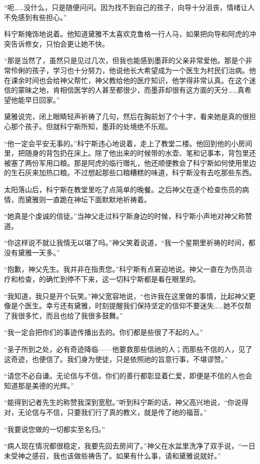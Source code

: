 “呃……没什么，只是随便问问。因为找不到自己的孩子，向导十分沮丧，情绪让人不免感到有些担心。”

科宁斯掩饰地说着。他知道黛雅不太喜欢克鲁格一行人马，如果把向导和阿虎的冲突告诉修女，只怕会更让她不快。

“那是当然了，虽然只是见过几次，但我也能感到墨菲的父亲非常爱他。那是个非常伶俐的孩子，学习也十分努力，他说他长大希望成为一个医生为村民们治病。他在课余时间也会给神父帮忙，神父教给他的医疗知识，他学得非常认真。在这个迷信的蒙昧之地，肯相信医学的人甚至都很少，而墨菲却很有这方面的天分……真希望他能早日回家。”

黛雅说完，闭上眼睛轻声祈祷了几句，然后在胸前划了个十字，看来她是真的很担心那个孩子。但就科宁斯所知，墨菲的处境绝不乐观。

“他一定会平安无事的。”科宁斯违心地说着，走上了教堂二楼。他回到他的小房间里，把随身的背包扔在床上。除了他出来的时候带的水壶、笔和记事本，背包里还被塞了两份军用口粮。那是阿虎的临行赠礼，他还顺便教会了科宁斯如何使用里边的生石灰来加热口粮。不过想起那些口粮糟糕的味道，科宁斯没有去吃那些东西。

太阳落山后，科宁斯在教堂里吃了点简单的晚餐。之后神父在逐个检查伤员的病情，而黛雅则一直跪在神坛下面默默地祈祷着。

“她真是个虔诚的信徒。”当神父走过科宁斯身边的时候，科宁斯小声地对神父称赞道。

“你这样说不就让我情无以堪了吗。”神父笑着说道，“我一个星期里祈祷的时间，都没有黛雅一天多。”

“抱歉，神父先生。我并非在指责您。”科宁斯有点窘迫地说。神父一直在为伤员治疗和检查，的确忙到停不下来，这一切科宁斯都是看在眼里的。

“我知道，我只是开个玩笑。”神父宽容地说，“也许我在这里做的事情，比起神父更像是个医生。幸亏还有黛雅，时刻提醒我们保持坚定的信仰不要迷失……她不仅帮了我很多忙，而且也给了我很多鼓舞。”

“我一定会把你们的事迹传播出去的。你们都是些很了不起的人。”

“圣子所到之处，必有奇迹降临——他要救那些信祂的人；而那些不信的人，见了这奇迹，也便信了。我们身为使徒，只是依照祂的旨意行事，不堪谬赞。”

“请您不必自谦。无论信与不信，你们的善行都彰显着仁爱，即便是不信的人也会知道那是美德的光辉。”

“能得到记者先生的称赞我深到宽慰。”听到科宁斯的话，神父高兴地说，“你说得对，无论信与不信，只要我们行了真的教义，就是传了祂的福音。”

“我要说您做的一切都实至名归。”

“病人现在情况都很稳定，我要先回去房间了。”神父在水盆里洗净了双手说，“一日未受神之感召，我也该做些祷告了。如果有什么事，请和黛雅说就好。”

